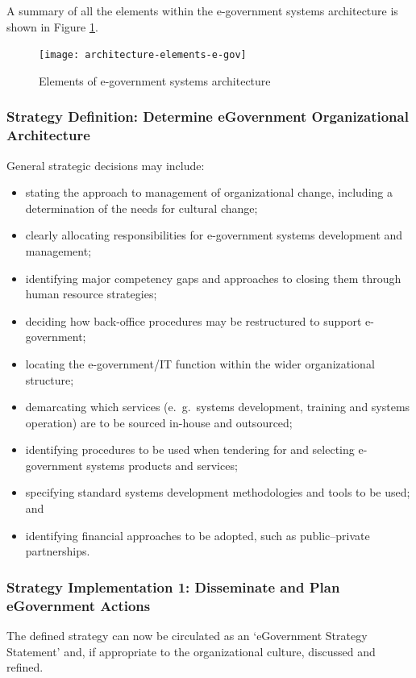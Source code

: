 A summary of all the elements within the
e-government systems architecture is shown
in Figure \ref{fig:architecture-elements-e-gov}.


\begin{figure}[ht!]
	\centering
	\texttt{[image: architecture-elements-e-gov]}
	\caption{Elements of e-government systems architecture}
	\label{fig:architecture-elements-e-gov}
\end{figure}


\subsubsection{Strategy Definition: Determine eGovernment Organizational Architecture}
General strategic decisions may include:

\begin{itemize}
	\item stating the approach to management of	organizational change, including a determination of the needs for cultural
	change;
	\item clearly allocating responsibilities for e-government systems development and
		management;
	\item identifying major competency gaps and	approaches to closing them through human resource strategies;
	\item deciding how back-office procedures may be restructured to support e-government;
	\item locating the e-government/IT function	within the wider organizational structure;
	\item demarcating which services (e.\ g.\ systems development, training and systems operation) are to be sourced in-house and outsourced;
	\item identifying procedures to be used when tendering for and selecting e-government systems products and services;
	\item specifying standard systems development methodologies and tools to be used; and
	\item identifying financial approaches to be adopted, such as public–private partnerships.
\end{itemize}


\subsubsection{Strategy Implementation 1: Disseminate and Plan eGovernment Actions}

The defined strategy can now be circulated as an ‘eGovernment Strategy Statement’ and,
if appropriate to the organizational culture, discussed and refined. 

